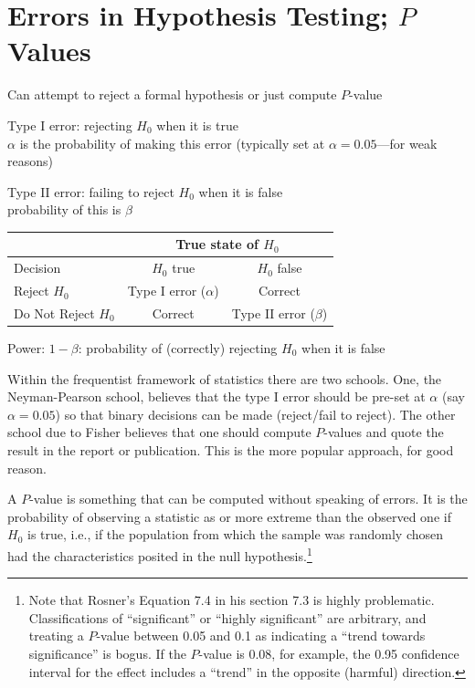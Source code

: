 \section{Errors in Hypothesis Testing; $P$ Values} 
\bi
\item Can attempt to reject a formal hypothesis or just compute
  $P$-value
\item Type I error: rejecting $H_0$ when it is true \\
  $\alpha$ is the probability of making this error (typically set at
  $\alpha=0.05$---for weak reasons)
\item Type II error: failing to reject $H_0$ when it is false \\
  probability of this is $\beta$
\begin{center}
\begin{tabular}{|l||c|c|} \hline
 & \multicolumn{2}{|c|}{True state of $H_0$} \\ \hline 
Decision & $H_0$ true & $H_0$ false \\ \hline \hline
Reject $H_0$ & Type I error ($\alpha$) & Correct \\  \hline
Do Not Reject $H_0$ & Correct & Type II error ($\beta$) \\  \hline
\end{tabular}
\end{center}

\item Power: $1 - \beta$: probability of (correctly) rejecting $H_0$
  when it is false
\ei

Within the frequentist framework of statistics there are two schools.
One, the Neyman-Pearson school, believes that the type I error should
be pre-set at $\alpha$ (say $\alpha=0.05$) so that binary decisions
can be made (reject/fail to reject).  The other school due to Fisher
believes that one should compute $P$-values and quote the result in
the report or publication.  This is the more popular approach, for
good reason.

A $P$-value is something that can be computed without speaking of
errors.  It is the probability of observing a statistic as or more
extreme than the observed one if $H_0$ is true, i.e., if the
population from which the sample was randomly chosen had the
characteristics posited in the null hypothesis.\footnote{Note that
  Rosner's Equation 7.4 in his section 7.3 is highly 
problematic.  Classifications of ``significant'' or ``highly
significant'' are arbitrary, and treating a $P$-value between 0.05 and
0.1 as indicating a ``trend towards significance'' is bogus.  If the
$P$-value is 0.08, for example, the 0.95 confidence interval for the
effect includes a ``trend'' in the opposite (harmful) direction.}


